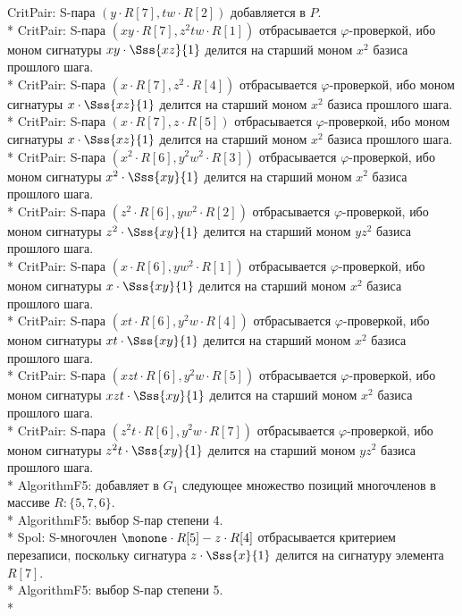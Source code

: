 CritPair: S-пара $(y\cdot R[7],tw\cdot R[2])$ добавляется в $P$.\\*
CritPair: S-пара $(xy\cdot R[7],z^{2}tw\cdot R[1])$  отбрасывается $\varphi$-проверкой, ибо моном сигнатуры $xy\cdot\Sss{xz}{1}$ делится на старший моном $x^{2}$ базиса прошлого шага.\\*
CritPair: S-пара $(x\cdot R[7],z^{2}\cdot R[4])$  отбрасывается $\varphi$-проверкой, ибо моном сигнатуры $x\cdot\Sss{xz}{1}$ делится на старший моном $x^{2}$ базиса прошлого шага.\\*
CritPair: S-пара $(x\cdot R[7],z\cdot R[5])$  отбрасывается $\varphi$-проверкой, ибо моном сигнатуры $x\cdot\Sss{xz}{1}$ делится на старший моном $x^{2}$ базиса прошлого шага.\\*
CritPair: S-пара $(x^{2}\cdot R[6],y^{2}w^{2}\cdot R[3])$  отбрасывается $\varphi$-проверкой, ибо моном сигнатуры $x^{2}\cdot\Sss{xy}{1}$ делится на старший моном $x^{2}$ базиса прошлого шага.\\*
CritPair: S-пара $(z^{2}\cdot R[6],yw^{2}\cdot R[2])$  отбрасывается $\varphi$-проверкой, ибо моном сигнатуры $z^{2}\cdot\Sss{xy}{1}$ делится на старший моном $yz^{2}$ базиса прошлого шага.\\*
CritPair: S-пара $(x\cdot R[6],yw^{2}\cdot R[1])$  отбрасывается $\varphi$-проверкой, ибо моном сигнатуры $x\cdot\Sss{xy}{1}$ делится на старший моном $x^{2}$ базиса прошлого шага.\\*
CritPair: S-пара $(xt\cdot R[6],y^{2}w\cdot R[4])$  отбрасывается $\varphi$-проверкой, ибо моном сигнатуры $xt\cdot\Sss{xy}{1}$ делится на старший моном $x^{2}$ базиса прошлого шага.\\*
CritPair: S-пара $(xzt\cdot R[6],y^{2}w\cdot R[5])$  отбрасывается $\varphi$-проверкой, ибо моном сигнатуры $xzt\cdot\Sss{xy}{1}$ делится на старший моном $x^{2}$ базиса прошлого шага.\\*
CritPair: S-пара $(z^{2}t\cdot R[6],y^{2}w\cdot R[7])$  отбрасывается $\varphi$-проверкой, ибо моном сигнатуры $z^{2}t\cdot\Sss{xy}{1}$ делится на старший моном $yz^{2}$ базиса прошлого шага.\\*
AlgorithmF5: добавляет в $G_{1}$ следующее множество позиций многочленов в массиве $R: \{5, 7, 6\}$.\\*
AlgorithmF5: выбор S-пар степени 4.\\*
Spol: S-многочлен $\monone\cdot R[5] - z\cdot R[4]$ отбрасывается критерием перезаписи, поскольку сигнатура $z\cdot\Sss{x}{1}$ делится на сигнатуру элемента $R[7]$.\\*
AlgorithmF5: выбор S-пар степени 5.\\*
